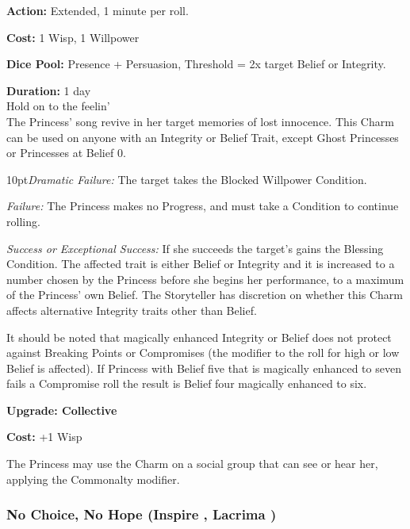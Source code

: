 \noindent \textbf{Action:} Extended, 1 minute per roll. 

\noindent \textbf{Cost:} 1 Wisp, 1 Willpower

\noindent \textbf{Dice Pool:} Presence + Persuasion, Threshold = 2x target Belief or Integrity.

\noindent \textbf{Duration:} 1 day \\

\noindent Hold on to the feelin' \\

\noindent The Princess’ song revive in her target memories of lost innocence. This Charm can be used on anyone with an Integrity or Belief Trait, except Ghost Princesses or Princesses at Belief 0. 

\begin{myindentpar}{10pt}\emph{Dramatic Failure:} The target takes the Blocked Willpower Condition.

    \emph{Failure:} The Princess makes no Progress, and must take a Condition to continue rolling. 

    \emph{Success or Exceptional Success:} If she succeeds the target's gains the Blessing Condition. The affected trait is either Belief or Integrity and it is increased to a number chosen by the Princess before she begins her performance, to a maximum of the Princess' own Belief. The Storyteller has discretion on whether this Charm affects alternative Integrity traits other than Belief.  

     It should be noted that magically enhanced Integrity or Belief does not protect against Breaking Points or Compromises (the modifier to the roll for high or low Belief is affected). If Princess with Belief five that is magically enhanced to seven fails a Compromise roll the result is Belief four magically enhanced to six. 

\textbf{Upgrade: Collective}

\noindent \textbf{Cost:} +1 Wisp

The Princess may use the Charm on a social group that can see or hear her, applying the Commonalty modifier.\end{myindentpar}

\subsubsection*{No Choice, No Hope (Inspire \textbullet\textbullet\textbullet\textbullet, Lacrima \textbullet\textbullet\textbullet)}

